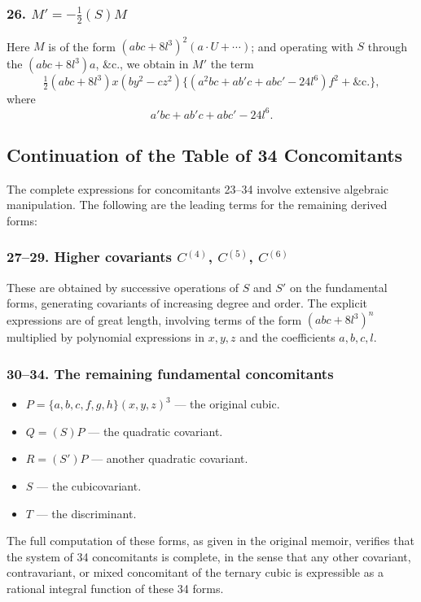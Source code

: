 \documentclass[11pt,a4paper]{article}
\theoremstyle{definition}
\begin{document}
\subsubsection*{26. $M' = -\frac{1}{2}(S)M$}

Here $M$ is of the form $(abc + 8l^3)^2(a\cdot U + \dotsb)$; and operating with $S$ through the $(abc + 8l^3)a$, \&c., we obtain in $M'$ the term
\[
\tfrac{1}{2}(abc + 8l^3)x(by^2 - cz^2)\{(a^2bc + ab'c + abc' - 24l^6)f^2 + \&\text{c.}\},
\]
where
\[
a'bc + ab'c + abc' - 24l^6.
\]

\subsection*{Continuation of the Table of 34 Concomitants}

The complete expressions for concomitants 23--34 involve extensive algebraic manipulation. The following are the leading terms for the remaining derived forms:

\subsubsection*{27--29. Higher covariants $C^{(4)}$, $C^{(5)}$, $C^{(6)}$}

These are obtained by successive operations of $S$ and $S'$ on the fundamental forms, generating covariants of increasing degree and order. The explicit expressions are of great length, involving terms of the form $(abc + 8l^3)^n$ multiplied by polynomial expressions in $x, y, z$ and the coefficients $a, b, c, l$.

\subsubsection*{30--34. The remaining fundamental concomitants}

\begin{itemize}
\item[30.] $P = \{a, b, c, f, g, h\}(x, y, z)^3$ --- the original cubic.
\item[31.] $Q = (S)P$ --- the quadratic covariant.
\item[32.] $R = (S')P$ --- another quadratic covariant.
\item[33.] $S$ --- the cubicovariant.
\item[34.] $T$ --- the discriminant.
\end{itemize}

The full computation of these forms, as given in the original memoir, verifies that the system of 34 concomitants is complete, in the sense that any other covariant, contravariant, or mixed concomitant of the ternary cubic is expressible as a rational integral function of these 34 forms.
\end{document}
